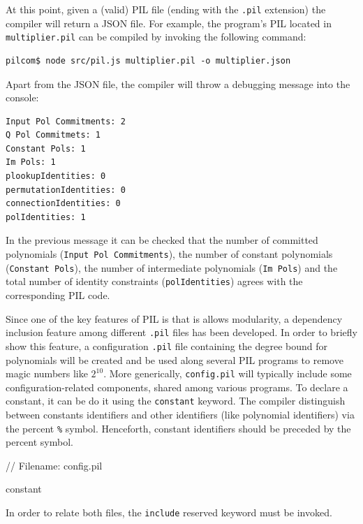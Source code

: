 At this point, given a (valid) PIL file (ending with the \texttt{.pil} extension) the \pilcom compiler will return a JSON file. %
For example, the \Multiplier program's PIL located in \texttt{multiplier.pil} can be compiled by invoking the following command:

\begin{lstlisting}
pilcom$ node src/pil.js multiplier.pil -o multiplier.json
\end{lstlisting}

Apart from the JSON file, the compiler will throw a debugging message into the console:

\begin{lstlisting}
Input Pol Commitments: 2
Q Pol Commitmets: 1
Constant Pols: 1
Im Pols: 1
plookupIdentities: 0
permutationIdentities: 0
connectionIdentities: 0
polIdentities: 1
\end{lstlisting}

In the previous message it can be checked that the number of committed polynomials (\texttt{Input Pol Commitments}), the number of constant polynomials (\texttt{Constant Pols}), the number of intermediate polynomials (\texttt{Im Pols}) and the total number of identity constraints (\texttt{polIdentities}) agrees with the corresponding PIL code. 



Since one of the key features of PIL is that is allows modularity, a dependency inclusion feature among different \texttt{.pil} files has been developed. In order to briefly show this feature, a configuration \texttt{.pil} file containing the degree bound for polynomials will be created and be used along several PIL programs to remove magic numbers like $2^{10}$. More generically, \texttt{config.pil} will typically include some configuration-related components, shared among various programs. To declare a constant, it can be do it using the \texttt{constant} keyword. The compiler distinguish between constants identifiers and other identifiers (like polynomial identifiers) via the percent \texttt{\%} symbol. Henceforth, constant identifiers should be preceded by the percent symbol. 

\begin{pil}
// Filename: config.pil

constant %
\end{pil}

In order to relate both files, the \texttt{include} reserved keyword must be invoked.

